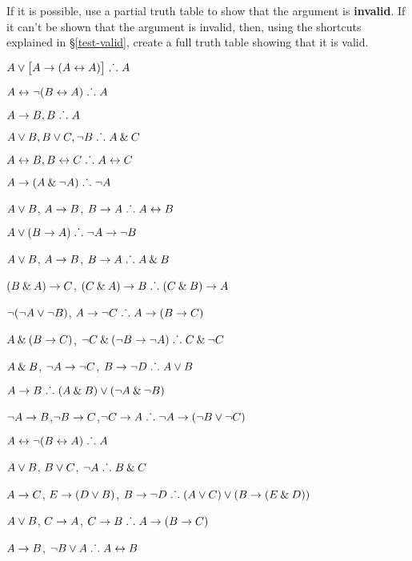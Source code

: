 \problempart
\label{pr.TT.valid4}
If it is possible, use a partial truth table to show that the argument is \textbf{invalid}. If it can't be shown that the argument is invalid, then, using the shortcuts explained in \S \ref{test-valid}, create a full truth table showing that it is valid.
\begin{earg}
\item $A\eor\bigl[A\eif(A\eiff A)\bigr] \therefore A$ %
\item $A\eiff\enot(B\eiff A) \therefore A$ %
\item $A\eif B, B \therefore A$ %
\item $A\eor B, B\eor C, \enot B \therefore A \eand C$ %
\item $A\eiff B, B\eiff C \therefore A\eiff C$ %
\item $A\eif(A\eand\enot A)\therefore \enot A$%
\item $A \eor B$, $A \eif B$, $B \eif A \therefore  A \eiff B$  %
\item $A\eor(B\eif A)\therefore \enot A \eif \enot B$ %
\item $A \eor B$, $A \eif B$, $ B \eif A \therefore  A \eand B$ %
\item $(B\eand A)\eif C$, $(C\eand A)\eif B\therefore (C\eand B)\eif A$ %
\item $\enot (\enot A \eor \enot B)$, $A \eif \enot C \therefore  A \eif (B \eif C)$ %
\item $A \eand (B \eif C)$, $\enot C \eand (\enot B \eif \enot A)\therefore C \eand \enot C$ %
\item $A \eand B$, $\enot A \eif \enot C$, $B \eif \enot D \therefore  A \eor B$ %
\item $A \eif B\therefore (A \eand B) \eor (\enot A \eand \enot B)$ %
\item $\enot A \eif B$,$ \enot B \eif C $,$ \enot C \eif A \therefore  \enot A \eif (\enot B \eor \enot C) $%
\item $A\eiff\enot(B\eiff A)\therefore A$ %
\item $A\eor B$, $B\eor C$, $\enot A\therefore B \eand C$ %
\item $A \eif C$, $E \eif (D \eor B)$, $B \eif \enot D\therefore (A \eor C) \eor (B \eif (E \eand D))$ %
\item $A \eor B$, $C \eif A$, $C \eif B\therefore A \eif (B \eif C)$ %
\item $A \eif B$, $\enot B \eor A\therefore A \eiff B$ %
\end{earg}

